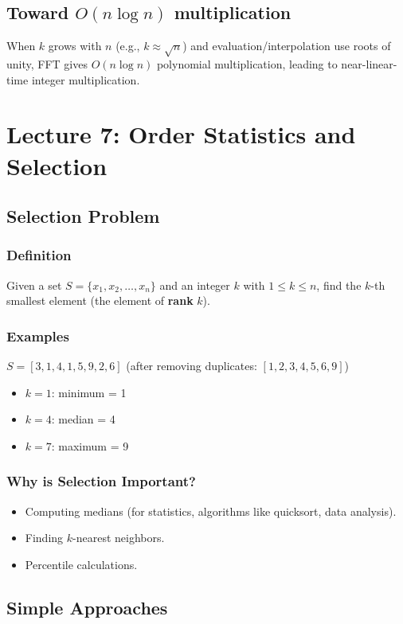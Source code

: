 \documentclass[11pt]{article}
\begin{document}
{{\subsection*{Toward $O(n \log n)$ multiplication}
When $k$ grows with $n$ (e.g., $k \approx \sqrt{n}$) and evaluation/interpolation use roots of
unity, FFT gives $O(n \log n)$ polynomial multiplication, leading to near-linear-time integer
multiplication.

\section{Lecture 7: Order Statistics and Selection}

\subsection*{Selection Problem}

\subsubsection*{Definition}
Given a set $S = \{x_1, x_2, \ldots, x_n\}$ and an integer $k$ with $1 \le k \le n$, find the $k$-th smallest element (the element of \textbf{rank} $k$).

\subsubsection*{Examples}
$S = [3, 1, 4, 1, 5, 9, 2, 6]$ (after removing duplicates: $[1, 2, 3, 4, 5, 6, 9]$)
\begin{itemize}
\item $k=1$: minimum = 1
\item $k=4$: median = 4
\item $k=7$: maximum = 9
\end{itemize}

\subsubsection*{Why is Selection Important?}
\begin{itemize}
\item Computing medians (for statistics, algorithms like quicksort, data analysis).
\item Finding $k$-nearest neighbors.
\item Percentile calculations.
\end{itemize}

\subsection*{Simple Approaches}

}}
\end{document}
